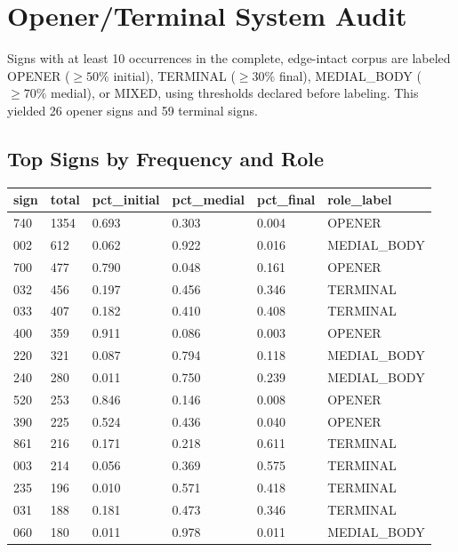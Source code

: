 \section{Opener/Terminal System Audit}

Signs with at least 10 occurrences in the complete, edge-intact corpus
are labeled OPENER ($\geq 50\%$ initial), TERMINAL ($\geq 30\%$ final),
MEDIAL\_BODY ($\geq 70\%$ medial), or MIXED, using thresholds declared before
labeling. This yielded 26 opener signs and 59 terminal signs.

\subsection{Top Signs by Frequency and Role}
\begin{tabular}{llllll}
\toprule
\textbf{sign} & \textbf{total} & \textbf{pct\_initial} & \textbf{pct\_medial} & \textbf{pct\_final} & \textbf{role\_label} \\
\midrule
740 & 1354 & 0.693 & 0.303 & 0.004 & OPENER \\
002 & 612 & 0.062 & 0.922 & 0.016 & MEDIAL\_BODY \\
700 & 477 & 0.790 & 0.048 & 0.161 & OPENER \\
032 & 456 & 0.197 & 0.456 & 0.346 & TERMINAL \\
033 & 407 & 0.182 & 0.410 & 0.408 & TERMINAL \\
400 & 359 & 0.911 & 0.086 & 0.003 & OPENER \\
220 & 321 & 0.087 & 0.794 & 0.118 & MEDIAL\_BODY \\
240 & 280 & 0.011 & 0.750 & 0.239 & MEDIAL\_BODY \\
520 & 253 & 0.846 & 0.146 & 0.008 & OPENER \\
390 & 225 & 0.524 & 0.436 & 0.040 & OPENER \\
861 & 216 & 0.171 & 0.218 & 0.611 & TERMINAL \\
003 & 214 & 0.056 & 0.369 & 0.575 & TERMINAL \\
235 & 196 & 0.010 & 0.571 & 0.418 & TERMINAL \\
031 & 188 & 0.181 & 0.473 & 0.346 & TERMINAL \\
060 & 180 & 0.011 & 0.978 & 0.011 & MEDIAL\_BODY \\
\bottomrule
\end{tabular}

